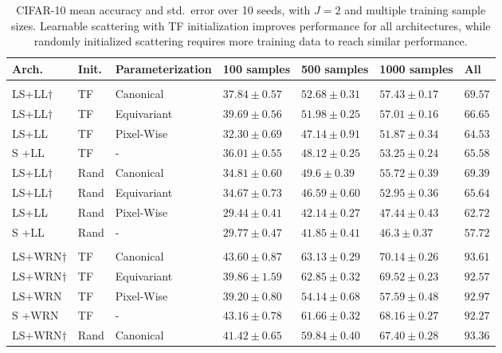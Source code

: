 \documentclass[10pt,twocolumn,letterpaper]{article}
\begin{document}
\begin{table*}[t] 
    \centering
    \caption{CIFAR-10 mean accuracy and std.\ error over 10 seeds, with $J=2$ and multiple training sample sizes. Learnable scattering with TF initialization improves performance for all architectures, while randomly initialized scattering requires more training data to reach similar performance.} 
    \label{table:cifarresults}
    \fontsize{8}{8.5}\selectfont 
    \begin{tabularx}{0.75\linewidth}{lllllll} 
          \hline
        Arch. &Init. &Parameterization & 100 samples &500 samples & 1000 samples & All \\
        \hline
        \\[-2mm]
        LS+LL$\dagger$&TF&Canonical&$37.84\pm0.57$ & $\mathbf{52.68}\pm0.31$ &$\mathbf{57.43}\pm0.17$&$\mathbf{69.57}$ \\ 
        LS+LL$\dagger$&TF&Equivariant& $\mathbf{39.69}\pm0.56$ & $51.98\pm0.25$ &$57.01\pm0.16$ & $66.65$\\
        LS+LL&TF&Pixel-Wise&$32.30 \pm 0.69$ & $47.14 \pm 0.91 $ &$ 51.87 \pm 0.34$& $64.53$\\
        S +LL&TF&-&$36.01\pm0.55$ & $48.12\pm0.25$ &$53.25\pm 0.24$&$65.58$ \\
        LS+LL$\dagger$&Rand&Canonical& $34.81\pm0.60$ & $49.6\pm0.39$ &$55.72\pm0.39$&$69.39$ \\ 
        LS+LL$\dagger$&Rand&Equivariant&$34.67\pm0.73$ & $46.59\pm0.60$ &$52.95\pm0.36$&$65.64$ \\ 
        LS+LL &Rand&Pixel-Wise&$29.44 \pm 0.41$ & $42.14 \pm 0.27$ &$47.44 \pm 0.43$&$62.72$ \\
        S +LL&Rand&-& $29.77\pm0.47$ & $41.85\pm0.41$ &$46.3\pm0.37$&$57.72$ \\ \hline
        \\[-2mm]
         LS+WRN$\dagger$&TF &Canonical&$\mathbf{43.60}\pm0.87$ & $\mathbf{63.13}\pm0.29$ &$70.14\pm0.26$&$93.61$ \\ 
         LS+WRN$\dagger$&TF &Equivariant&$ 39.86\pm1.59$ & $62.85\pm0.32$ &$69.52\pm 0.23$&$ 92.57 $  \\  
         LS+WRN&TF &Pixel-Wise&$39.20\pm0.80$ & $54.14\pm0.68$ &$57.59\pm0.48 $ &$ 92.97$ \\
        S +WRN&TF &-&$43.16\pm0.78$ & $61.66\pm0.32$ &$68.16\pm0.27$ &$92.27$ \\ 
       LS+WRN$\dagger$& Rand &Canonical& $41.42\pm0.65$ & $59.84\pm0.40$ &$67.40\pm0.28$&$93.36$ \\

\end{tabularx}
\end{table*}
\end{document}
